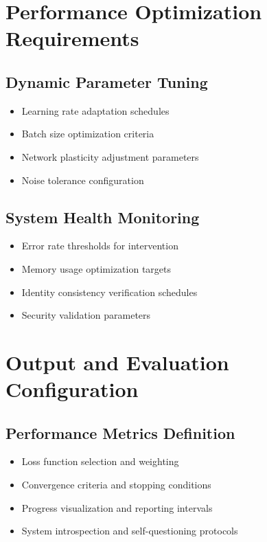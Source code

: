 \documentclass[11pt,a4paper]{article}
\begin{document}
\section{Performance Optimization Requirements}

\subsection{Dynamic Parameter Tuning}
\begin{itemize}[leftmargin=0.5in]
    \item Learning rate adaptation schedules
    \item Batch size optimization criteria
    \item Network plasticity adjustment parameters
    \item Noise tolerance configuration
\end{itemize}

\subsection{System Health Monitoring}
\begin{itemize}[leftmargin=0.5in]
    \item Error rate thresholds for intervention
    \item Memory usage optimization targets
    \item Identity consistency verification schedules
    \item Security validation parameters
\end{itemize}

\section{Output and Evaluation Configuration}

\subsection{Performance Metrics Definition}
\begin{itemize}[leftmargin=0.5in]
    \item Loss function selection and weighting
    \item Convergence criteria and stopping conditions
    \item Progress visualization and reporting intervals
    \item System introspection and self-questioning protocols
\end{itemize}
\end{document}
